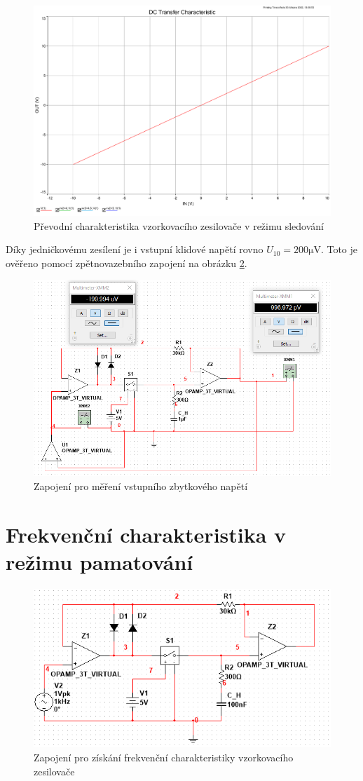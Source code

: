 \documentclass[twoside]{article}
\begin{document}
\begin{figure}[h!]
    \centering
    \includegraphics[width=0.4\linewidth]{prevod_char.pdf}
    \caption{Převodní charakteristika vzorkovacího zesilovače v režimu sledování}
    \label{fig:prevodni_char}
\end{figure}

Díky jedničkovému zesílení je i vstupní klidové napětí rovno $U_{10} = 200 \si{\micro\volt}$.
Toto je ověřeno pomocí zpětnovazebního zapojení na obrázku \ref{fig:vstupni_zbytkove}.

\begin{figure}[h!]
    \centering
    \includegraphics[width=0.55\linewidth]{zbytkove_u.png}
    \caption{Zapojení pro měření vstupního zbytkového napětí}
    \label{fig:vstupni_zbytkove}
\end{figure}

\newpage
\section{Frekvenční charakteristika v režimu pamatování}


\begin{figure}[h!]
    \centering
    \includegraphics[width=0.55\linewidth]{bode_schema.png}
    \caption{Zapojení pro získání frekvenční charakteristiky vzorkovacího zesilovače}
    \label{fig:schema_bode}
\end{figure}
\end{document}
